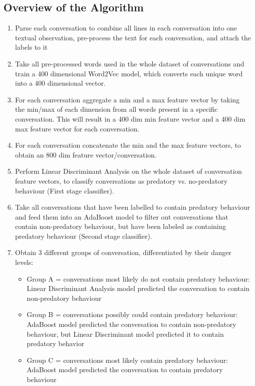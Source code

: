 \documentclass[11pt]{article}
\begin{document}
\subsection{Overview of the Algorithm}
\begin{enumerate}
    \item Parse each conversation to combine all lines in each conversation into one textual observation, pre-process the text for each conversation, and attach the labels to it 
    \item Take all pre-processed words used in the whole dataset of conversations and train a 400 dimensional Word2Vec model, which converts each unique word into a 400 dimensional vector.
    \item For each conversation aggregate a min and a max feature vector by taking the min/max of each dimension from all words present in a specific conversation. This will result in a 400 dim min feature vector and a 400 dim max feature vector for each conversation.
    \item For each conversation concatenate the min and the max feature vectors, to obtain an 800 dim feature vector/conversation.
    \item Perform Linear Discriminant Analysis on the whole dataset of conversation feature vectors, to classify conversations as predatory vs. no-predatory behaviour (First stage classifier).
    \item Take all conversations that have been labelled to contain predatory behaviour and feed them into an AdaBoost model to filter out conversations that contain non-predatory behaviour, but have been labeled as containing predatory behaviour (Second stage classifier).
    \item Obtain 3 different groups of conversation, differentiated by their danger levels:
    \begin{itemize}
        \item Group A = conversations most likely do not contain predatory behaviour: Linear Discriminant Analysis model predicted the conversation to contain non-predatory behaviour 
        \item Group B = conversations possibly could contain predatory behaviour: AdaBoost model predicted the conversation to contain non-predatory behaviour, but Linear Discriminant model predicted it to contain predatory behavior
        \item Group C = conversations most likely contain predatory behaviour: AdaBoost model predicted the conversation to contain predatory behaviour
    \end{itemize}
\end{enumerate}
\end{document}
